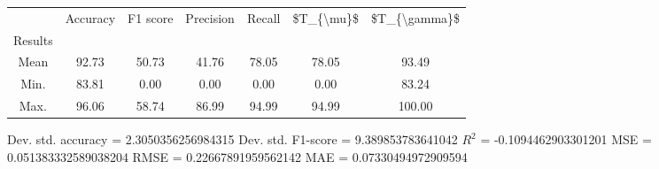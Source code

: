 \begin{tabular}{|c|c|c|c|c|c|c|}
\toprule
{} &  Accuracy &  F1 score &  Precision &  Recall &  \$T\_\{\textbackslash mu\}\$ &  \$T\_\{\textbackslash gamma\}\$ \\
Results &           &           &            &         &            &               \\
\hline
Mean    &     92.73 &     50.73 &      41.76 &   78.05 &      78.05 &         93.49 \\
Min.    &     83.81 &      0.00 &       0.00 &    0.00 &       0.00 &         83.24 \\
Max.    &     96.06 &     58.74 &      86.99 &   94.99 &      94.99 &        100.00 \\
\bottomrule
\end{tabular}

 Dev. std. accuracy = 2.3050356256984315
 Dev. std. F1-score = 9.389853783641042
 $R^2$ = -0.1094462903301201
 MSE = 0.051383332589038204
 RMSE = 0.22667891959562142
 MAE = 0.07330494972909594